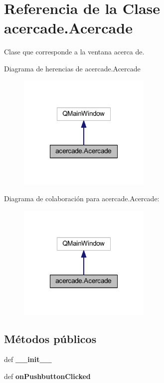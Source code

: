 \section{Referencia de la Clase acercade.\-Acercade}
\label{classacercade_1_1_acercade}


Clase que corresponde a la ventana acerca de.  




Diagrama de herencias de acercade.\-Acercade\nopagebreak
\begin{figure}[H]
\begin{center}
\leavevmode
\includegraphics[width=180pt]{classacercade_1_1_acercade__inherit__graph}
\end{center}
\end{figure}


Diagrama de colaboración para acercade.\-Acercade\-:\nopagebreak
\begin{figure}[H]
\begin{center}
\leavevmode
\includegraphics[width=180pt]{classacercade_1_1_acercade__coll__graph}
\end{center}
\end{figure}
\subsection*{Métodos públicos}
\begin{DoxyCompactItemize}
\item 
def {\bf \-\_\-\-\_\-init\-\_\-\-\_\-}
\item 
def {\bf on\-Pushbutton\-Clicked}
\end{DoxyCompactItemize}
